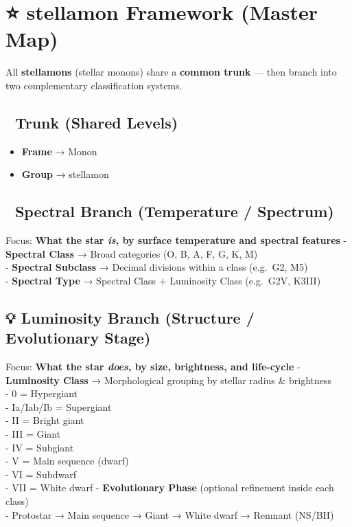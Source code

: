 \documentclass[
  letterpaper,
]{book}
\providecommand{\tightlist}{%
  \setlength{\itemsep}{0pt}\setlength{\parskip}{0pt}}
\begin{document}
\chapter{⭐ stellamon Framework (Master
Map)}\label{stellamon-framework-master-map}

All \textbf{stellamons} (stellar monons) share a \textbf{common trunk}
--- then branch into two complementary classification systems.

\section{🌳 Trunk (Shared Levels)}\label{trunk-shared-levels}

\begin{itemize}
\tightlist
\item
  \textbf{Frame} → Monon\\
\item
  \textbf{Group} → stellamon
\end{itemize}

\section{🌈 Spectral Branch (Temperature /
Spectrum)}\label{spectral-branch-temperature-spectrum}

Focus: \textbf{What the star \emph{is}, by surface temperature and
spectral features} - \textbf{Spectral Class} → Broad categories (O, B,
A, F, G, K, M)\\
- \textbf{Spectral Subclass} → Decimal divisions within a class
(e.g.~G2, M5)\\
- \textbf{Spectral Type} → Spectral Class + Luminosity Class (e.g.~G2V,
K3III)

\section{💡 Luminosity Branch (Structure / Evolutionary
Stage)}\label{luminosity-branch-structure-evolutionary-stage}

Focus: \textbf{What the star \emph{does}, by size, brightness, and
life-cycle} - \textbf{Luminosity Class} → Morphological grouping by
stellar radius \& brightness\\
- 0 = Hypergiant\\
- Ia/Iab/Ib = Supergiant\\
- II = Bright giant\\
- III = Giant\\
- IV = Subgiant\\
- V = Main sequence (dwarf)\\
- VI = Subdwarf\\
- VII = White dwarf - \textbf{Evolutionary Phase} (optional refinement
inside each class)\\
- Protostar → Main sequence → Giant → White dwarf → Remnant (NS/BH)
\end{document}

